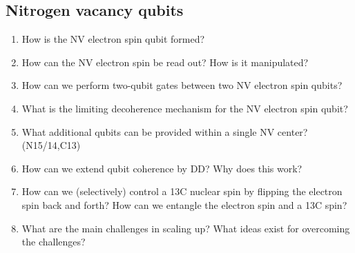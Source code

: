 \documentclass[a4paper]{scrartcl}
\newcommand{\qa}[2]{#1\\ \textit{#2}}
\begin{document}
\subsection*{Nitrogen vacancy qubits}
\begin{enumerate}
  \item \qa{How is the NV electron spin qubit formed?}{}
  \item \qa{How can the NV electron spin be read out? How is it manipulated?}{}
  \item \qa{How can we perform two-qubit gates between two NV electron spin qubits?}{}
  \item \qa{What is the limiting decoherence mechanism for the NV electron spin qubit?}{}
  \item \qa{What additional qubits can be provided within a single NV center? (N15/14,C13)}{}
  \item \qa{How can we extend qubit coherence by DD? Why does this work?}{}
  \item \qa{How can we (selectively) control a 13C nuclear spin by flipping the electron spin back and forth? How can we entangle the electron spin and a 13C spin?}{}
  \item \qa{What are the main challenges in scaling up? What ideas exist for overcoming the challenges?}{}
\end{enumerate}
\end{document}

